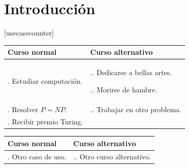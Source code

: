 \documentclass[a4paper, 10pt, twoside]{article}
\begin{document}
\newpage




\tableofcontents

\newpage




\section{Introducción}


[usecasecounter]

\newenvironment{usecase}
  {
    \begin{tabular}{|l|p{5cm}|}
    \hline
    Curso normal & Curso alternativo \\
    \hline
    \hline
    \setcounter{usecasecounter}{0}
  }{
    \end{tabular}
  }

\newcommand\ucitem[2]{
	\stepcounter{usecasecounter}
	\arabic{usecasecounter}. #1 & #2 \\
	\hline
}

\newcommand\ucalt[1]{
	\stepcounter{usecasealtcounter}
	\arabic{usecasecounter}.\arabic{usecasealtcounter}. #1
}




\begin{usecase}
  \ucitem{Estudiar computación.}
         {\ucalt{Dedicarse a bellas artes.}
          \ucalt{Morirse de hambre.}}
  \ucitem{Resolver $P=NP$.}
         {\ucalt{Trabajar en otro problema.}}
  \ucitem{Recibir premio Turing.}{}
\end{usecase}

\vspace{5cm}

\begin{usecase}
  \ucitem{Otro caso de uso.}
         {\ucalt{Otro curso alternativo.}}
\end{usecase}

\vspace{2cm}
\end{document}
